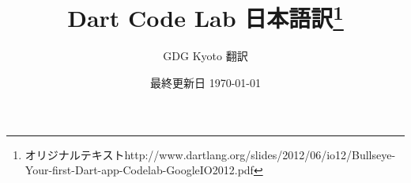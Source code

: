 \documentclass[12pt]{jbook}
\title{Dart Code Lab 日本語訳\footnote{オリジナルテキストhttp://www.dartlang.org/slides/2012/06/io12/Bullseye-Your-first-Dart-app-Codelab-GoogleIO2012.pdf}}
\author{GDG Kyoto 翻訳}
\date{最終更新日 \today}
\begin{document}
\begin{titlepage}
\maketitle
\thispagestyle{empty}
\end{titlepage}
\tableofcontents
{}

\newcommand{\img}[1]{\vspace{5mm}\texttt{[image: \#1]}\vspace{5mm}}
\newcommand{\imgw}[1]{\vspace{5mm}\texttt{[image: \#1]}\vspace{5mm}}

\newcommand{\ochapter}[1]{\chapter*{#1}
\addtocounter{chapter}{1}
\setcounter{section}{1}
\addcontentsline{toc}{chapter}{#1}}

\newcommand{\ifyougetstuck}[1]{もし，作業につまづいた場合は#1のフォルダの内容をstart-hereフォルダにコピーすることで，この部分の作業内容を終わらせた状態にすることができます．}

\newcommand{\hint}[1]{
\vspace{5mm}
\begin{itembox}[l]{ヒント}
#1
\end{itembox}}

\newcommand{\advancedtopic}[1]{
\vspace{5mm}
\begin{itembox}[l]{発展的なトピック}
#1
\end{itembox}
}

\newcommand{\tip}[1]{
\vspace{5mm}
\begin{itembox}[l]{豆知識}
#1
\end{itembox}
}


\newpage
\end{document}
